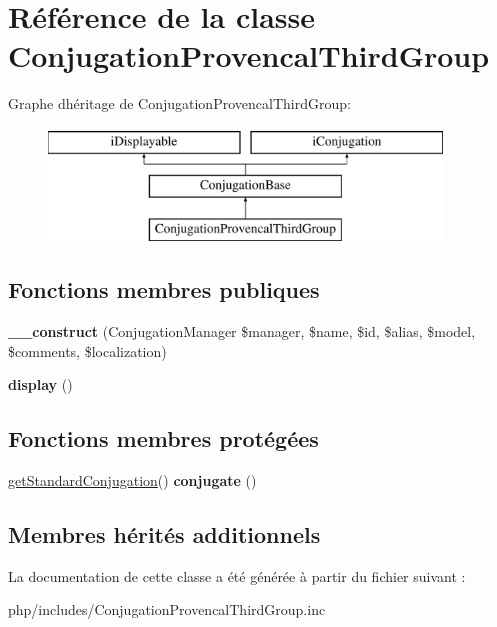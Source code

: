 \hypertarget{classConjugationProvencalThirdGroup}{}\section{Référence de la classe Conjugation\+Provencal\+Third\+Group}
\label{classConjugationProvencalThirdGroup}
Graphe d\textquotesingle{}héritage de Conjugation\+Provencal\+Third\+Group\+:\begin{figure}[H]
\begin{center}
\leavevmode
\includegraphics[height=3.000000cm]{classConjugationProvencalThirdGroup}
\end{center}
\end{figure}
\subsection*{Fonctions membres publiques}
\begin{DoxyCompactItemize}
\item 
\hypertarget{classConjugationProvencalThirdGroup_afed342691cc7dc2dd626040c8fa26774}{}\label{classConjugationProvencalThirdGroup_afed342691cc7dc2dd626040c8fa26774} 
{\bfseries \+\_\+\+\_\+construct} (Conjugation\+Manager \$manager, \$name, \$id, \$alias, \$model, \$comments, \$localization)
\item 
\hypertarget{classConjugationProvencalThirdGroup_a5be367146782812cba9ff8209cf79be2}{}\label{classConjugationProvencalThirdGroup_a5be367146782812cba9ff8209cf79be2} 
{\bfseries display} ()
\end{DoxyCompactItemize}
\subsection*{Fonctions membres protégées}
\begin{DoxyCompactItemize}
\item 
\hypertarget{classConjugationProvencalThirdGroup_ab4005ad44671e23386f8ef1f833b6959}{}\label{classConjugationProvencalThirdGroup_ab4005ad44671e23386f8ef1f833b6959} 
\hyperlink{classConjugationBase_a97684bf47a4b158a2d4f5716f9187730}{get\+Standard\+Conjugation}() {\bfseries conjugate} ()
\end{DoxyCompactItemize}
\subsection*{Membres hérités additionnels}


La documentation de cette classe a été générée à partir du fichier suivant \+:\begin{DoxyCompactItemize}
\item 
php/includes/Conjugation\+Provencal\+Third\+Group.\+inc\end{DoxyCompactItemize}
